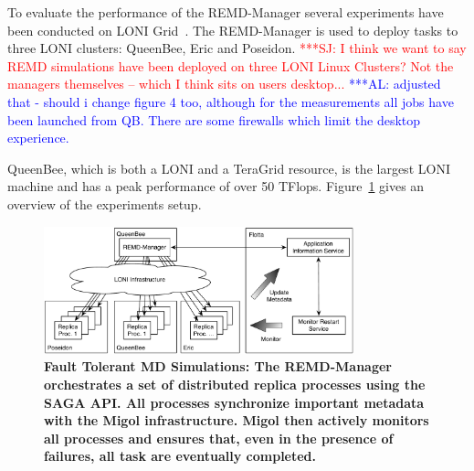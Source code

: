 \documentclass[times, 10pt, twocolumn]{article}
\newcommand{\alnote}[1]{ {\textcolor{blue} { ***AL: #1 }}}
\newcommand{\jhanote}[1]{ {\textcolor{red} { ***SJ: #1 }}}
\newcommand{\alnote}[1]{}
\newcommand{\jhanote}[1]{}
\begin{document}
\label{sec:exp}       
        
To evaluate the performance of the REMD-Manager several experiments
have been conducted on LONI Grid~\cite{Allen:2003xy}. The REMD-Manager
is used to deploy tasks to three LONI clusters: QueenBee,
Eric and Poseidon. 
\jhanote{I think we want to say REMD simulations
have been deployed on three LONI Linux Clusters? Not the managers
 themselves -- which I think sits on users desktop...} 
\alnote{adjusted that - should i change figure 4 too, 
although for the measurements all jobs have been launched from QB. There are 
some firewalls which limit the desktop experience.} 
 
QueenBee, which is both a LONI and a TeraGrid resource, is the largest LONI
machine and has a peak performance of over 50 TFlops.
Figure~\ref{fig:saga-taskfarming} gives an overview of the experiments
setup.

\begin{figure}[t]
    \centering
        \includegraphics[width=0.8\textwidth]{saga-taskfarming}
        \caption{\small \bf Fault Tolerant MD Simulations: The
          REMD-Manager orchestrates a set of distributed replica
          processes using the SAGA API. All processes synchronize
          important metadata with the Migol infrastructure. Migol then
          actively monitors all processes and ensures that, even in
          the presence of failures, all task are eventually
          completed.}
    \label{fig:saga-taskfarming}
  \end{figure} 
\end{document}
